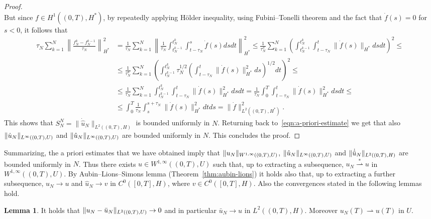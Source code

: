 \documentclass[a4paper,10pt,oneside]{amsbook}
\numberwithin{section}{chapter}
\numberwithin{equation}{chapter}
\theoremstyle{definition}
\newtheorem{lemma}[prop]{Lemma}
\DeclarePairedDelimiter{\norm}{\lVert}{\rVert}
\begin{document}
\begin{proof}
\[\]
But since $f\in H^1((0,T),H^*)$, by repeatedly applying H\"older inequality, using Fubini--Tonelli theorem and the fact that $\dot f(s)=0$ for $s<0$, it follows that
\[
\begin{split}
\tau_N\sum_{k=1}^N\left\|\frac{f_N^k-f_N^{k-1}}{\tau_N}\right\|_{H^*}^2&=\frac{1}{\tau_N}\sum_{k=1}^N\left\|\frac{1}{\tau_N}\int_{t_N^{k-1}}^{t_N^k}\int_{t-\tau_N}^s\dot{f}(s)dsdt\right\|_{H^*}^2\le\frac{1}{\tau_N^3}\sum_{k=1}^N\left(\int_{t_N^{k-1}}^{t_N^k}\int_{t-\tau_N}^t\|\dot{f}(s)\|_{H^*}dsdt\right)^2\le\\
&\le\frac{1}{\tau_N^3}\sum_{k=1}^N\left(\int_{t_N^{k-1}}^{t_N^k}\tau_N^{1/2}\left(\int_{t-\tau_N}^t\|\dot{f}(s)\|_{H^*}^2ds\right)^{1/2}dt\right)^2\le\\
&\le\frac{1}{\tau_N}\sum_{k=1}^N\int_{t_N^{k-1}}^{t_N^k}\int_{t-\tau_N}^t\|\dot{f}(s)\|_{H^*}^2dsdt=\frac{1}{\tau_N}\int_0^T\int_{t-\tau_N}^t\|\dot{f}(s)\|_{H^*}^2dsdt\le\\
&\le\int_0^T\frac{1}{\tau_N}\int_s^{s+\tau_N}\|\dot{f}(s)\|_{H^*}^2dtds=\|\dot{f}\|_{L^2((0,T),H^*)}^2.
\end{split}
\]
This shows that $S_N^N=\|\dot{\hat{u}}_N\|_{L^2((0,T),H)}$ is bounded uniformly in $N$. Returning back to~\eqref{eqn:a-priori-estimate} we get that also $\norm{\dot u_N}_{L^\infty((0,T),U)}$ and $\norm{\hat u_N}_{L^\infty((0,T),U)}$ are bounded uniformly in $N$. This concludes the proof.
\end{proof}
Summarizing, the a priori estimates that we have obtained imply that $\norm{u_N}_{W^{1,\infty}((0,T),U)}$, $\norm{\hat u_N}_{L^\infty((0,T),U)}$ and $\norm{\dot{\hat{u}}_N}_{L^2((0,T),H)}$ are bounded uniformly in $N$. Thus there exists $u\in W^{1,\infty}((0,T),U)$ such that, up to extracting a subsequence, $u_N\overset{*}{\rightharpoonup}u$ in $W^{1,\infty}((0,T),U)$. By Aubin--Lions--Simons lemma (Theorem~\ref{thm:aubin-lions}) it holds also that, up to extracting a further subsequence, $u_N\to u$ and $\hat{u}_N\to v$ in $C^0([0,T],H)$, where $v\in C^0([0,T],H)$. Also the convergences stated in the following lemmas hold.
\begin{lemma}
It holds that $\norm{u_N-\bar u_N}_{L^2((0,T),U)}\to0$ and in particular $\bar u_N\to u$ in $L^2((0,T),H)$. Moreover $u_N(T)\rightharpoonup u(T)$ in $U$.
\end{lemma}
\end{document}
